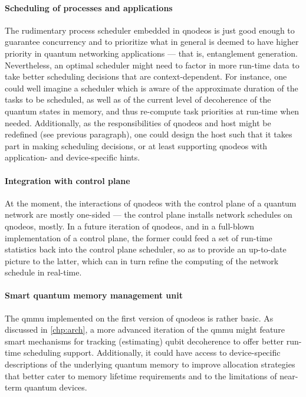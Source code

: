 \paragraph{Scheduling of processes and applications}

The rudimentary process scheduler embedded in \acrshort{qnodeos} is just good enough to guarantee
concurrency and to prioritize what in general is deemed to have higher priority in quantum
networking applications --- that is, entanglement generation. Nevertheless, an optimal scheduler
might need to factor in more run-time data to take better scheduling decisions that are
context-dependent. For instance, one could well imagine a scheduler which is aware of the
approximate duration of the tasks to be scheduled, as well as of the current level of decoherence of
the quantum states in memory, and thus re-compute task priorities at run-time when needed.
Additionally, as the responsibilities of \acrshort{qnodeos} and host might be redefined (see
previous paragraph), one could design the host such that it takes part in making scheduling
decisions, or at least supporting \acrshort{qnodeos} with application- and device-specific hints.

\paragraph{Integration with control plane}

At the moment, the interactions of \acrshort{qnodeos} with the control plane of a quantum network
are mostly one-sided --- the control plane installs network schedules on \acrshort{qnodeos}, mostly.
In a future iteration of \acrshort{qnodeos}, and in a full-blown implementation of a control plane,
the former could feed a set of run-time statistics back into the control plane scheduler, so as to
provide an up-to-date picture to the latter, which can in turn refine the computing of the network
schedule in real-time.

\paragraph{Smart quantum memory management unit}

The \acrfull{qmmu} implemented on the first version of \acrshort{qnodeos} is rather basic. As
discussed in \cref{chp:arch}, a more advanced iteration of the \acrshort{qmmu} might feature smart
mechanisms for tracking (estimating) qubit decoherence to offer better run-time scheduling support.
Additionally, it could have access to device-specific descriptions of the underlying quantum memory
to improve allocation strategies that better cater to memory lifetime requirements and to the
limitations of near-term quantum devices.

